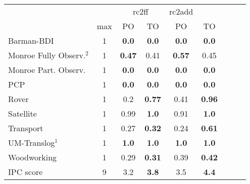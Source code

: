 \begin{tabular}{lccccccccl} 
\toprule 
  && \multicolumn{2}{c}{rc2ff} & \multicolumn{2}{c}{rc2add} \\ 
\cmidrule(lr){3-4} \cmidrule(lr){5-6}  
 & max &PO & TO & PO &\multicolumn{2}{c}{ TO  } \\ 
\midrule 
Barman-BDI & 1 & \textbf{0.0} & \textbf{0.0} & \textbf{0.0} &\multicolumn{2}{c}{ \textbf{0.0}  } \\ 
Monroe Fully Observ.$^{2}$ & 1 & \textbf{0.47} & 0.41 & \textbf{0.57} &\multicolumn{2}{c}{ 0.45  } \\ 
Monroe Part. Observ. & 1 & \textbf{0.0} & \textbf{0.0} & \textbf{0.0} &\multicolumn{2}{c}{ \textbf{0.0}  } \\ 
PCP & 1 & \textbf{0.0} & \textbf{0.0} & \textbf{0.0} &\multicolumn{2}{c}{ \textbf{0.0}  } \\ 
Rover & 1 & 0.2 & \textbf{0.77} & 0.41 &\multicolumn{2}{c}{ \textbf{0.96}  } \\ 
Satellite & 1 & 0.99 & \textbf{1.0} & 0.91 &\multicolumn{2}{c}{ \textbf{1.0}  } \\ 
Transport & 1 & 0.27 & \textbf{0.32} & 0.24 &\multicolumn{2}{c}{ \textbf{0.61}  } \\ 
UM-Translog$^{1}$ & 1 & \textbf{1.0} & \textbf{1.0} & \textbf{1.0} &\multicolumn{2}{c}{ \textbf{1.0}  } \\ 
Woodworking & 1 & 0.29 & \textbf{0.31} & 0.39 &\multicolumn{2}{c}{ \textbf{0.42}  } \\ 
\midrule 
 IPC score & 9 & 3.2 & \textbf{3.8} & 3.5 &\multicolumn{2}{c}{ \textbf{4.4}  } \\ 
\bottomrule 
 \end{tabular} 
